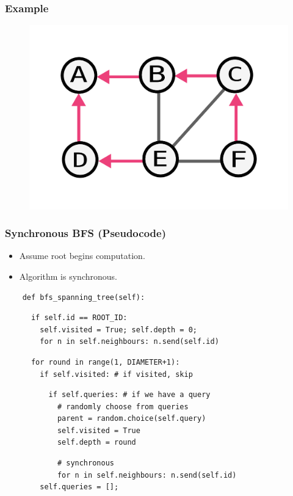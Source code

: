 \documentclass{beamer}
\begin{document}
\begin{frame}
    \frametitle{Example}
    \begin{figure}
    \includegraphics[width=0.5\paperwidth]{round3-end.pdf}
    \end{figure}
\end{frame}

\begin{frame}[fragile]
    \frametitle{Synchronous BFS (Pseudocode)}
    \begin{itemize}
        \item Assume root begins computation.
        \item Algorithm is synchronous.
    \end{itemize}
    \pause

    \begin{verbatim}
    def bfs_spanning_tree(self):
    \end{verbatim}
    \pause
    \begin{verbatim}
      if self.id == ROOT_ID:
        self.visited = True; self.depth = 0;
        for n in self.neighbours: n.send(self.id)
    \end{verbatim}
    \pause
    \begin{verbatim}
      for round in range(1, DIAMETER+1):
        if self.visited: # if visited, skip
    \end{verbatim}
    \pause
    \begin{verbatim}
          if self.queries: # if we have a query
            # randomly choose from queries
            parent = random.choice(self.query)
            self.visited = True
            self.depth = round
    \end{verbatim}
    \pause
    \begin{verbatim}
            # synchronous
            for n in self.neighbours: n.send(self.id)
        self.queries = [];
    \end{verbatim}
\end{frame}
\end{document}
